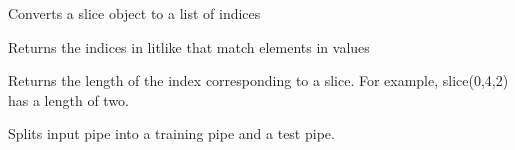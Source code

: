\documentclass[letterpaper,10pt,english]{sphinxmanual}
\begin{document}

\begin{fulllineitems}
\label{\detokenize{Fireworks:Fireworks.utils.utils.slice_to_list}}
Converts a slice object to a list of indices

\end{fulllineitems}


\begin{fulllineitems}
\label{\detokenize{Fireworks:Fireworks.utils.utils.get_indices}}
Returns the indices in litlike that match elements in values

\end{fulllineitems}


\begin{fulllineitems}
\label{\detokenize{Fireworks:Fireworks.utils.utils.slice_length}}
Returns the length of the index corresponding to a slice.
For example, slice(0,4,2) has a length of two.

\end{fulllineitems}

\label{\detokenize{Fireworks:module-Fireworks.toolbox.preprocessing}}

\begin{fulllineitems}
\label{\detokenize{Fireworks:Fireworks.toolbox.preprocessing.train_test_split}}
Splits input pipe into a training pipe and a test pipe.

\end{fulllineitems}

\end{document}
